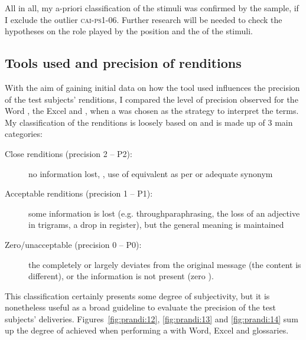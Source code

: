 \documentclass[output=paper]{langsci/langscibook}
\begin{document}
All in all, my a-priori classification of the stimuli was confirmed by the sample, if I exclude the outlier \textsc{cai}-\textsc{ps1-06}. Further research will be needed to check the hypotheses on the role played by the position and the  of the stimuli.


\subsection{Tools used and precision of renditions}\label{sec:prandi:5.2}

With the aim of gaining initial data on how the tool used influences the precision of the test subjects’ renditions, I compared the level of precision observed for the Word , the Excel  and , when a  was chosen as the strategy to interpret the terms. My classification of the renditions is loosely based on \citet{Wadensjö1998} and is made up of 3 main categories:

\begin{description}
\item[Close renditions (precision 2 – P2):] no information lost, , use of equivalent as per  or adequate synonym
\item[Acceptable renditions (precision 1 – P1):] some information is lost (e.g. through\linebreak paraphrasing, the loss of an adjective in trigrams, a drop in register), but the general meaning is maintained
\item[Zero/unacceptable  (precision 0 – P0):] the  completely or largely deviates from the original message (the content is different), or the information is not present (zero ).
\end{description}

This classification certainly presents some degree of subjectivity, but it is none\-theless useful as a broad guideline to evaluate the precision of the test subjects’ deliveries. Figures~\ref{fig:prandi:12}, \ref{fig:prandi:13} and \ref{fig:prandi:14} sum up the degree of  achieved when performing a  with Word, Excel and  glossaries. 
\end{document}
